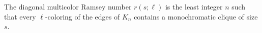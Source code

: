\begin{definition}
The diagonal multicolor Ramsey number \(r(s;\ell)\) is the least integer \(n\) such that every \(\ell\)-coloring of the edges of \(K_n\) contains a monochromatic clique of size \(s\).
\end{definition}
